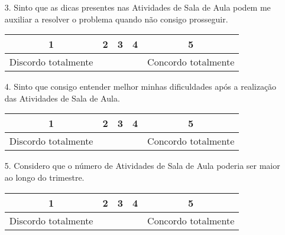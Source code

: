 \begin{itemize}
    \item[3.] Sinto que as dicas presentes nas Atividades de Sala de Aula podem me auxiliar a resolver o problema quando não consigo prosseguir.
    \vspace{0.75cm}
    
    \begin{minipage}{\linewidth}
    \centering
    \begin{tabular}{|c|c|c|c|c|}
    \hline
    \textbf{1} & \textbf{2} & \textbf{3} & \textbf{4} & \textbf{5} \\
    \hline
    Discordo totalmente & \phantom{aaaaaaaa} & \phantom{aaaaaaaa} & \phantom{aaaaaaaa} & Concordo totalmente \\
    \hline
    \end{tabular}
    \end{minipage}

    \item[4.] Sinto que consigo entender melhor minhas dificuldades após a realização das Atividades de Sala de Aula.
    \vspace{0.75cm}
    
    \begin{minipage}{\linewidth}
    \centering
    \begin{tabular}{|c|c|c|c|c|}
    \hline
    \textbf{1} & \textbf{2} & \textbf{3} & \textbf{4} & \textbf{5} \\
    \hline
    Discordo totalmente & \phantom{aaaaaaaa} & \phantom{aaaaaaaa} & \phantom{aaaaaaaa} & Concordo totalmente \\
    \hline
    \end{tabular}
    \end{minipage}
\newline\newline\newline
    \item[5.] Considero que o número de Atividades de Sala de Aula poderia ser maior ao longo do trimestre.
    \vspace{0.75cm}
    
    \begin{minipage}{\linewidth}
    \centering
    \begin{tabular}{|c|c|c|c|c|}
    \hline
    \textbf{1} & \textbf{2} & \textbf{3} & \textbf{4} & \textbf{5} \\
    \hline
    Discordo totalmente & \phantom{aaaaaaaa} & \phantom{aaaaaaaa} & \phantom{aaaaaaaa} & Concordo totalmente \\
    \hline
    \end{tabular}
    \end{minipage}
\end{itemize}

